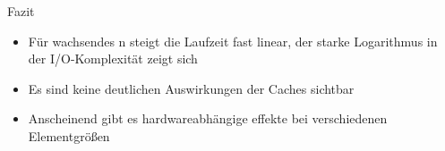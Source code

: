 \documentclass[ngerman,aspectratio=169,10pt]{beamer}
\begin{document}
\begin{frame}{Fazit}
\begin{itemize}
    \item Für wachsendes n steigt die Laufzeit fast linear, der starke Logarithmus in der I/O-Komplexität zeigt sich
    \item Es sind keine deutlichen Auswirkungen der Caches sichtbar
    \item Anscheinend gibt es hardwareabhängige effekte bei verschiedenen Elementgrößen
\end{itemize}
\end{frame}
\end{document}
